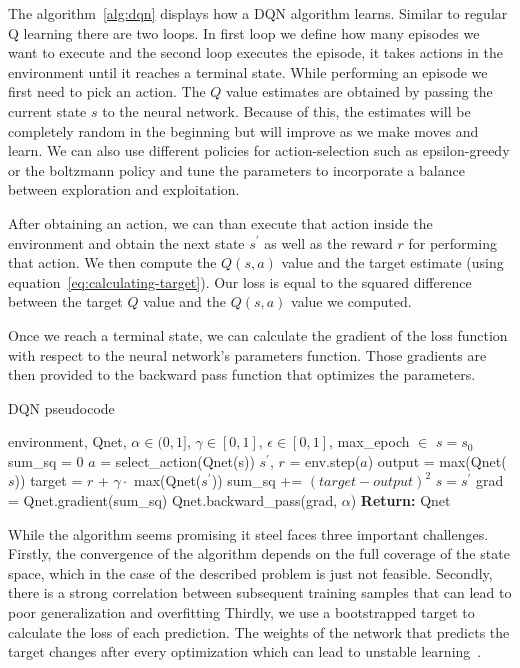 \documentclass{article}
\begin{document}
The algorithm~\ref{alg:dqn} displays how a DQN algorithm learns.
Similar to regular Q learning there are two loops.
In first loop we define how many episodes we want to execute and the second loop executes the episode,
it takes actions in the environment until it reaches a terminal state.
While performing an episode we first need to pick an action.
The $Q$ value estimates are obtained by passing the current state $s$ to the neural network.
Because of this, the estimates will be completely random in the beginning but will improve as we make moves and learn.
We can also use different policies for action-selection such as epsilon-greedy or the boltzmann policy
and tune the parameters to incorporate a balance between exploration and exploitation.

After obtaining an action, we can than execute that action inside the environment and obtain the next state $s^\prime$
as well as the reward $r$ for performing that action.
We then compute the $Q(s,a)$ value and the target estimate (using equation~\ref{eq:calculating-target}).
Our loss is equal to the squared difference between the target $Q$ value and the $Q(s,a)$ value we computed.

Once we reach a terminal state, we can calculate the gradient of the loss function with respect to
the neural network's parameters function.
Those gradients are then provided to the backward pass function that optimizes the parameters.

\begin{algorithm}
   \caption{DQN pseudocode}
   \begin{algorithmic}
      \REQUIRE environment, Qnet, $\alpha \in (0,1]$, $\gamma \in [0,1]$, $\epsilon \in [0,1]$, max\_epoch $\in$ 
      \STATE $s = s_0$ 
         \STATE sum\_sq = 0
            \STATE $a$ = select\_action(Qnet(s))
            \STATE $s^\prime$, $r$ = env.step($a$)
            \STATE output = max(Qnet($s$))
            \STATE target = $r$ + $\gamma \cdot$ max(Qnet($s^\prime$))
            \STATE sum\_sq += $(target - output)^2$
            \STATE $s = s^\prime$
         \ENDWHILE
         \STATE grad = Qnet.gradient(sum\_sq)
         \STATE Qnet.backward\_pass(grad, $\alpha$)
      \ENDFOR
      \STATE \textbf{Return:} Qnet
   \end{algorithmic}
   \label{alg:dqn}
\end{algorithm}

While the algorithm seems promising it steel faces three important challenges.
Firstly, the convergence of the algorithm depends on the full coverage of the state space, which in the case of the described
problem is just not feasible.
Secondly, there is a strong correlation between subsequent training samples that can lead to poor generalization and overfitting
Thirdly, we use a bootstrapped target to calculate the loss of each prediction.
The weights of the network that predicts the target changes after every optimization which can lead to unstable learning~\cite{DBLP:books/sp/Plaat22}.
\end{document}
